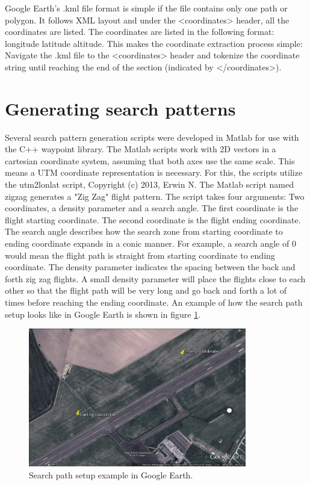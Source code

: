Google Earth's .kml file format is simple if the file contains only one path or polygon.
It follows XML layout and under the <coordinates> header, all the coordinates are listed.
The coordinates are listed in the following format: longitude latitude altitude.
This makes the coordinate extraction process simple: Navigate the .kml file to the <coordinates>
header and tokenize the coordinate string until reaching the end of the section (indicated by
</coordinates>).

\section{Generating search patterns}
Several search pattern generation scripts were developed in Matlab for use with the C++ waypoint
library.
The Matlab scripts work with 2D vectors in a cartesian coordinate system, assuming that both axes
use the same scale. This means a UTM coordinate representation is necessary. For this, the scripts
utilize the utm2lonlat script, Copyright (c) 2013, Erwin N.
The Matlab script named zigzag generates a "Zig Zag" flight pattern.
The script takes four arguments: Two coordinates, a density parameter and a search angle.
The first coordinate is the flight starting coordinate. The second coordinate is the flight ending
coordinate.
The search angle describes how the search zone from starting coordinate to ending coordinate
expands in a conic manner.
For example, a search angle of 0 would mean the flight path is straight from starting coordinate to
ending coordinate.
The density parameter indicates the spacing between the back and forth zig zag flights.
A small density parameter will place the flights close to each other so that
the flight path will be very long and go back and forth a lot of times before reaching the ending
coordinate.
An example of how the search path setup looks like in Google Earth is shown in figure
\ref{fig:googlepath}.
\begin{figure}[ht]
	\centering
	\includegraphics[width=0.85\textwidth]{Images/googlepath}
	\caption[Search path setup.]{Search path setup example in Google Earth.}
	\label{fig:googlepath}
\end{figure}
